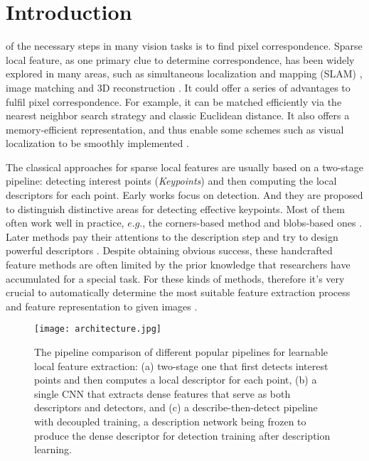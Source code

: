 \documentclass[journal]{IEEEtran}
\begin{document}
\section{Introduction}



 of the necessary steps in many vision tasks is to find pixel correspondence. Sparse local feature, as one primary clue to determine correspondence, has been widely explored in many areas, such as simultaneous localization and mapping (SLAM) \cite{9261135,9531062,9173732}, image matching \cite{9527141,9447920} and 3D reconstruction \cite{9817616,6359953,8962030}. It could offer a series of advantages to fulfil pixel correspondence. For example, it can be matched efficiently via the nearest neighbor search strategy and classic Euclidean distance. It also offers a memory-efficient representation, and thus enable some schemes such as visual localization to be smoothly implemented \cite{D2net}.

The classical approaches for sparse local features are usually based on a two-stage pipeline: detecting interest points (\emph{Keypoints}) and then computing the local descriptors for each point. Early works \cite{hcrt:21,BRISK} focus on detection. And they are proposed to distinguish distinctive areas for detecting effective keypoints. Most of them often work well in practice, $e.g.$, the corners-based method \cite{Harris1988ACC} and blobs-based ones \cite{hcrt:21,hcrt:28}. Later methods pay their attentions to the description step and try to design powerful descriptors \cite{SURF,ORB,BRIEF}. Despite obtaining obvious success, these handcrafted feature methods are often limited by the prior knowledge that researchers have accumulated for a special task. For these kinds of methods, therefore it's very crucial to automatically determine the most suitable feature extraction process and feature representation to given images \cite{R2D2}.

\begin{figure}[t]
\centering
\texttt{[image: architecture.jpg]}
\caption{The pipeline comparison of different popular pipelines for learnable local feature extraction: (a) two-stage one that first detects interest points and then computes a local descriptor for each point, (b) a single CNN that extracts dense features that serve as both descriptors and detectors, and  (c) a describe-then-detect pipeline with decoupled training, a description network being frozen to produce the dense descriptor for detection training after description learning.}
\label{fig1}
\end{figure}
\end{document}
